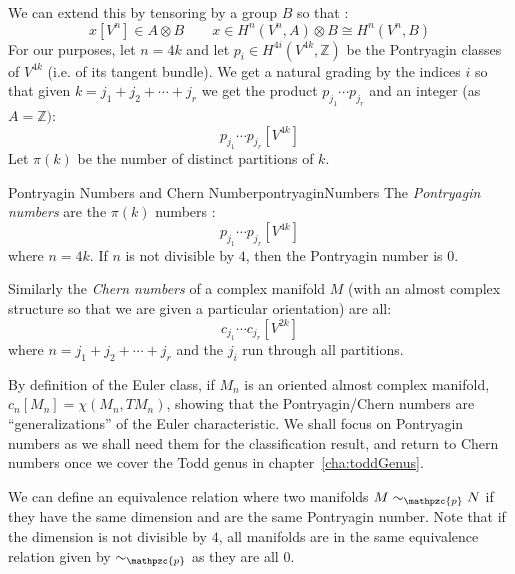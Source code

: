 \documentclass{book}
\newcommand{\Z}{{\mathbb{Z}}}
\newcommand{\cp}{{\mathpzc{p}}}
\newcommand{\qn}{\quad\newline}
\begin{document}
We can extend this by tensoring by a group $B$ so that :
\[
  x[V^n] \in A\otimes B \qquad x \in H^n(V^n, A)\otimes B \cong H^n(V^n, B)
\]
For our purposes, let $n = 4k$ and let $p_i \in H^{4i}(V^{4k}, \Z)$ be the Pontryagin classes of $V^{4k}$
(i.e. of its tangent bundle). We
get a natural grading by the indices $i$ so that given $k = j_1 + j_2 + \cdots + j_r$ we get the product
$p_{j_1}\cdots p_{j_r}$ and an integer (as $A = \Z)$:
\[
  p_{j_1}\cdots p_{j_r}[V^{4k}]
\]
Let $\pi(k)$ be the number of distinct partitions of $k$.

\begin{defn}{Pontryagin Numbers and Chern Number}{pontryaginNumbers}
  The \emph{Pontryagin numbers} are the $\pi(k)$ numbers :
  \[
    p_{j_1}\cdots p_{j_r}[V^{4k}]
  \]
  where $n = 4k$. If $n$ is not divisible by $4$, then the Pontryagin number is $0$.

  \qn
  Similarly the \emph{Chern numbers} of a complex manifold $M$ (with an almost complex structure so that we
  are given a particular orientation) are all:
  \[
    c_{j_1}\cdots c_{j_r}[V^{2k}]
  \]
  where $n = j_1 + j_2 + \cdots + j_r$ and the $j_i$ run through all partitions.
\end{defn}

By definition of the Euler class, if $M_n$ is an oriented almost complex manifold, $c_n[M_n] = \chi(M_n,
TM_n)$, showing that the Pontryagin/Chern numbers are ``generalizations'' of the Euler characteristic. We
shall focus on Pontryagin numbers as we shall need them for the classification result, and return to Chern
numbers once we cover the Todd genus in chapter~\ref{cha:toddGenus}.

We can define an equivalence relation where two manifolds $M\sim_\cp N$ if they have the same dimension and
are the same Pontryagin number. Note that if the dimension is not divisible by $4$, all manifolds are in the
same equivalence relation given by $\sim_\cp$ as they are all $0$.
\end{document}
